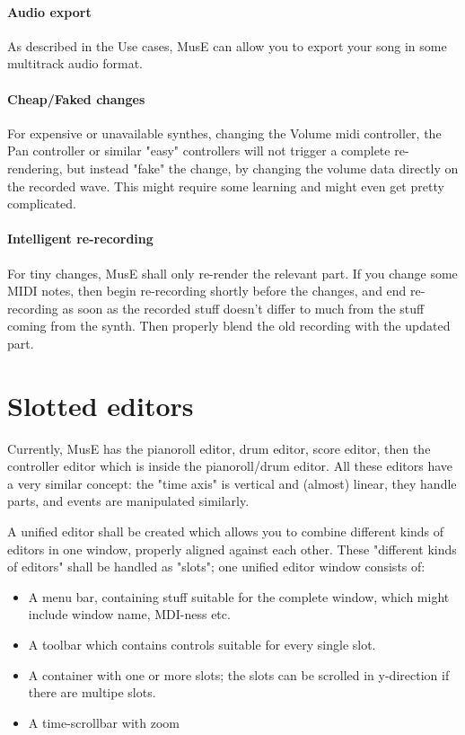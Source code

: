 \documentclass[a4paper]{report}
\begin{document}
\paragraph{Audio export}
As described in the Use cases, MusE can allow you to export your song
in some multitrack audio format.

\paragraph{Cheap/Faked changes}
For expensive or unavailable synthes, changing the Volume midi controller,
the Pan controller or similar "easy" controllers will not trigger a
complete re-rendering, but instead "fake" the change, by changing
the volume data directly on the recorded wave. This might require some
learning and might even get pretty complicated.

\paragraph{Intelligent re-recording}
For tiny changes, MusE shall only re-render the relevant part. If you
change some MIDI notes, then begin re-recording shortly before the
changes, and end re-recording as soon as the recorded stuff doesn't
differ to much from the stuff coming from the synth. Then properly
blend the old recording with the updated part.



\section{Slotted editors}
Currently, MusE has the pianoroll editor, drum editor, score editor,
then the controller editor which is inside the pianoroll/drum editor.
All these editors have a very similar concept: the "time axis" is
vertical and (almost) linear, they handle parts, and events are
manipulated similarly.

A unified editor shall be created which allows you to combine different
kinds of editors in one window, properly aligned against each other.
These "different kinds of editors" shall be handled as "slots"; one
unified editor window consists of:
\begin{itemize}
\item A menu bar, containing stuff suitable for the complete window,
      which might include window name, MDI-ness etc.
\item A toolbar which contains controls suitable for every single slot.
\item A container with one or more slots; the slots can be scrolled in
      y-direction if there are multipe slots.
\item A time-scrollbar with zoom
\end{itemize}
\end{document}
